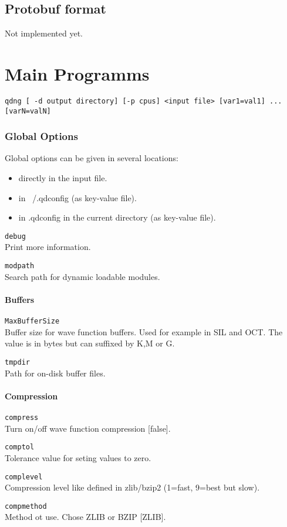 \documentclass[a4paper,12pt]{scrbook}
\newcommand{\option}[2]{\item \texttt{#1}\\ #2}
\begin{document}
\section{Protobuf format}
Not implemented yet.

\chapter{Main Programms}

\begin{verbatim}
qdng [ -d output directory] [-p cpus] <input file> [var1=val1] ... [varN=valN] 
\end{verbatim}

\subsection{Global Options}
Global options can be given in several locations:
\begin{itemize}
 \item directly in the input file.
 \item in ~/.qdconfig (as key-value file).
 \item in .qdconfig in the current directory (as key-value file).
\end{itemize}

\begin{options}
 \option{debug}{Print more information.}
 \option{modpath}{Search path for dynamic loadable modules.}
\end{options} 

\subsubsection{Buffers}
\begin{options}
 \option{MaxBufferSize}{Buffer size for wave function buffers. Used for example in SIL and OCT. The value is in bytes but
 can suffixed by K,M or G.}
 \option{tmpdir}{Path for on-disk buffer files.}
\end{options}

\subsubsection{Compression}
\begin{options}
 \option{compress}{Turn on/off wave function compression [false].}
 \option{comptol}{Tolerance value for seting values to zero.}
 \option{complevel}{Compression level like defined in zlib/bzip2 (1=fast, 9=best but slow).}
 \option{compmethod}{Method ot use. Chose ZLIB or BZIP [ZLIB].}
\end{options}
\end{document}
